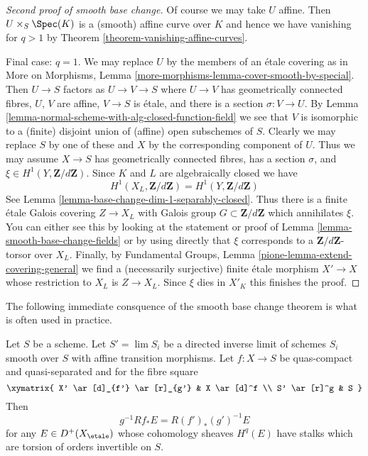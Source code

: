 \begin{proof}[Second proof of smooth base change]
\medskip\noindent
Of course we may take $U$ affine. Then $U \times_S \Spec(K)$
is a (smooth) affine curve over $K$ and hence we have vanishing
for $q > 1$ by Theorem \ref{theorem-vanishing-affine-curves}.

\medskip\noindent
Final case: $q = 1$. We may replace $U$ by the members of an
\'etale covering as in More on Morphisms, Lemma
\ref{more-morphisms-lemma-cover-smooth-by-special}.
Then $U \to S$ factors as $U \to V \to S$ where
$U \to V$ has geometrically connected fibres,
$U$, $V$ are affine, $V \to S$ is \'etale, and there is
a section $\sigma : V \to U$. By
Lemma \ref{lemma-normal-scheme-with-alg-closed-function-field}
we see that $V$ is isomorphic to a (finite) disjoint union of
(affine) open subschemes of $S$.
Clearly we may replace $S$ by one of these
and $X$ by the corresponding component of $U$.
Thus we may assume $X \to S$ has geometrically connected
fibres, has a section $\sigma$, and
$\xi \in H^1(Y, \mathbf{Z}/d\mathbf{Z})$.
Since $K$ and $L$ are algebraically closed we have
$$
H^1(X_L, \mathbf{Z}/d\mathbf{Z}) =
H^1(Y, \mathbf{Z}/d\mathbf{Z})
$$
See Lemma \ref{lemma-base-change-dim-1-separably-closed}.
Thus there is a finite \'etale Galois covering
$Z \to X_L$ with Galois group $G \subset \mathbf{Z}/d\mathbf{Z}$
which annihilates $\xi$.
You can either see this by looking at the statement or
proof of Lemma \ref{lemma-smooth-base-change-fields}
or by using directly that $\xi$ corresponds to a
$\mathbf{Z}/d\mathbf{Z}$-torsor over $X_L$.
Finally, by
Fundamental Groups, Lemma \ref{pione-lemma-extend-covering-general}
we find a (necessarily surjective)
finite \'etale morphism $X' \to X$
whose restriction to $X_L$ is $Z \to X_L$.
Since $\xi$ dies in $X'_K$ this finishes the proof.
\end{proof}

\noindent
The following immediate consquence of the smooth base change
theorem is what is often used in practice.

\begin{lemma}
\label{lemma-smooth-base-change-general}
Let $S$ be a scheme. Let $S' = \lim S_i$ be a directed inverse
limit of schemes $S_i$ smooth over $S$ with affine transition
morphisms. Let $f : X \to S$ be quas-compact and quasi-separated
and for the fibre square
$$
\xymatrix{
X' \ar[d]_{f'} \ar[r]_{g'} & X \ar[d]^f \\
S' \ar[r]^g & S
}
$$
Then
$$
g^{-1}Rf_*E = R(f')_*(g')^{-1}E
$$
for any $E \in D^+(X_\etale)$ whose cohomology sheaves $H^q(E)$
have stalks which are torsion of orders invertible on $S$.
\end{lemma}

